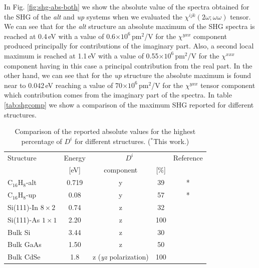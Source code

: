 \documentclass[pss]{wiley2sp} %
\begin{document}
In Fig. \ref{fig:shg-abs-both}  we show the absolute value of the  spectra obtained
for the SHG of the \emph{alt} and \emph{up} systems when we evaluated the $
\chi^{ijk}(2\omega;\omega\omega) $ tensor. We can see
that for the \emph{alt} structure an absolute
maximum of the SHG spectra is reached at 0.4\,eV with a value of
0.6$\times10^{6} $\,pm$^{2}$/V for the $\chi^{yxx} $ component produced
principally for contributions of the imaginary part. Also, a second local
maximum is reached at 1.1\,eV with a value of 0.55$\times10^{6} $\,pm$^{2}$/V
for the $\chi^{xxx} $ component having in this case a principal contribution
from the real part. In the other hand, we can see that for the
\emph{up} structure the absolute maximum is found near to 0.042\,eV reaching a
value of 70$\times10^{6} $\,pm$^{2}$/V for the $\chi^{yxx} $ tensor component
which contribution comes from the imaginary part of the spectra. In table
\ref{tab:shgcomp} we show a comparison of the maximum SHG reported for
different structures.


\begin{table}
    \caption{Comparison of the reported absolute values for the highest 
    percentage of {$D^{i}$} for different structures. ($^{*}$This work.)}
    \label{tab:dacomp}
    \centering
    \begin{tabular}{lcccc}
    Structure & Energy &  \multicolumn{2}{c}{$D^{i}$} &  Reference\\
    \cline{3-4}
              & [eV]   & component & [\%] \\
    \hline
    C$_{16}$H$_{8}$-alt               & 0.719 & y & 39 & *     \\
    C$_{16}$H$_{8}$-up                & 0.08  & y & 57 & *     \\
    Si(111)-In $8\times2$   & 0.74  & z & 32 & \cite{arzate2014optical}  \\
    Si(111)-As $1\times1$   & 2.20  & z & 100& \cite{mendoza2012optical} \\
    Bulk Si                 & 3.44  & z & 30 & \cite{nastos2007full}     \\
    Bulk GaAs               & 1.50  & z & 50 & \cite{nastos2007full} 
    \cite{bhat2005excitonic} \\
    Bulk CdSe               & 1.8   & z {\scriptsize (\emph{yz} polarization)} 
    & 100& \cite{nastos2007full}\\
    \end{tabular}
\end{table}
\end{document}
